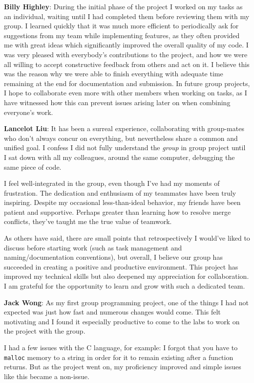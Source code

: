\documentclass{ictex}
\begin{document}
\textbf{Billy Highley}: During the initial phase of the project I worked on my tasks as an individual, waiting until I had completed them before reviewing them with my group. I learned quickly that it was much more efficient to periodically ask for suggestions from my team while implementing features, as they often provided me with great ideas which significantly improved the overall quality of my code. I was very pleased with everybody’s contributions to the project, and how we were all willing to accept constructive feedback from others and act on it. I believe this was the reason why we were able to finish everything with adequate time remaining at the end for documentation and submission. In future group projects, I hope to collaborate even more with other members when working on tasks, as I have witnessed how this can prevent issues arising later on when combining everyone’s work.

\textbf{Lancelot Liu}: It has been a surreal experience, collaborating with group-mates who don't always concur on everything, but nevertheless share a common and unified goal. I confess I did not fully understand the \textit{group} in group project until I sat down with all my colleagues, around the same computer, debugging the same piece of code.

I feel well-integrated in the group, even though I've had my moments of frustration. The dedication and enthusiasm of my teammates have been truly inspiring. Despite my occasional less-than-ideal behavior, my friends have been patient and supportive. Perhaps greater than learning how to resolve merge conflicts, they’ve taught me the true value of teamwork.

As others have said, there are small points that retrospectively I would've liked to discuss before starting work (such as task management and naming/documentation conventions), but overall, I believe our group has succeeded in creating a positive and productive environment. This project has improved my technical skills but also deepened my appreciation for collaboration. I am grateful for the opportunity to learn and grow with such a dedicated team.

\textbf{Jack Wong}: As my first group programming project, one of the things I had not expected was just how fast and numerous changes would come. This felt motivating and I found it especially productive to come to the labs to work on the project with the group.

I had a few issues with the C language, for example: I forgot that you have to \texttt{malloc} memory to a string in order for it to remain existing after a function returns. But as the project went on, my proficiency improved and simple issues like this became a non-issue.
\end{document}
